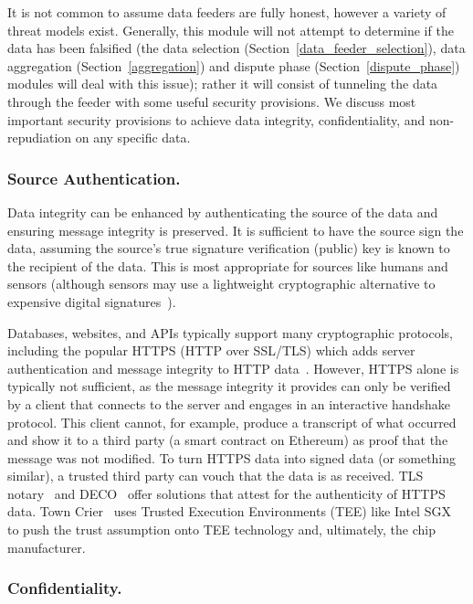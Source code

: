 It is not common to assume data feeders are fully honest, however a variety of threat models exist. Generally, this module will not attempt to determine if the data has been falsified (the data selection (Section~\ref{data_feeder_selection}), data aggregation (Section~\ref{aggregation}) and dispute phase (Section~\ref{dispute_phase}) modules will deal with this issue); rather it will consist of tunneling the data through the feeder with some useful security provisions. We discuss most important security provisions to achieve data integrity, confidentiality, and non-repudiation on any specific data. 


\subsubsection{Source Authentication.}\label{source_authentication}
Data integrity can be enhanced by authenticating the source of the data and ensuring message integrity is preserved. It is sufficient to have the source sign the data, assuming the source's true signature verification (\ie public) key is known to the recipient of the data. This is most appropriate for sources like humans and sensors (although sensors may use a lightweight cryptographic alternative to expensive digital signatures~\cite{sallam2018survey}).

Databases, websites, and APIs typically support many cryptographic protocols, including the popular HTTPS (HTTP over SSL/TLS) which adds server authentication and message integrity to HTTP data~\cite{clark2013sok}. However, HTTPS alone is typically not sufficient, as the message integrity it provides can only be verified by a client that connects to the server and engages in an interactive handshake protocol. This client cannot, for example, produce a transcript of what occurred and show it to a third party (\eg a smart contract on Ethereum) as proof that the message was not modified. To turn HTTPS data into signed data (or something similar), a trusted third party can vouch that the data is as received. TLS notary~\cite{tlsnotary} and DECO~\cite{zhang2019deco} offer solutions that attest for the authenticity of HTTPS data. Town Crier~\cite{zhang2016town} uses Trusted Execution Environments (TEE) like Intel SGX~\cite{costan2016intel} to push the trust assumption onto TEE technology and, ultimately, the chip manufacturer.

\subsubsection{Confidentiality.}

